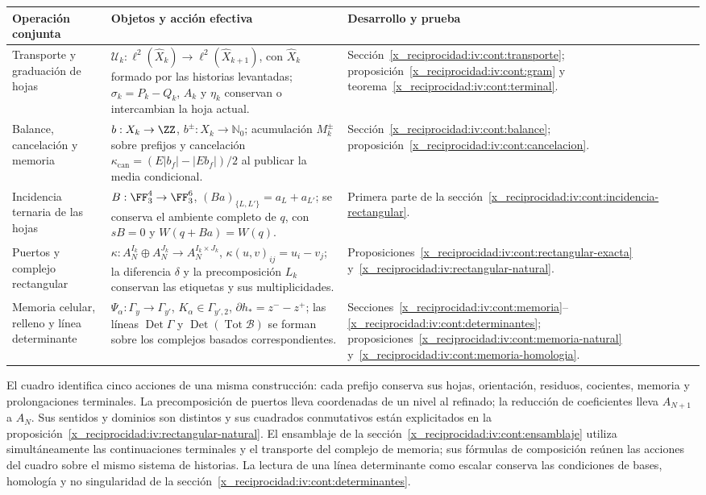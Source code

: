 \begin{center}
\small
\begin{tabular}{@{}p{.21\linewidth}p{.48\linewidth}p{.23\linewidth}@{}}
\toprule
Operación conjunta & Objetos y acción efectiva & Desarrollo y prueba\\
\midrule
Transporte y graduación de hojas
& \(\mathcal U_k:\ell^2(\widehat X_k)\to
\ell^2(\widehat X_{k+1})\), con \(\widehat X_k\) formado por
las historias levantadas; \(\sigma_k=P_k-Q_k\), \(A_k\) y
\(\eta_k\) conservan o intercambian la hoja actual.
& Sección~\ref{x_reciprocidad:iv:cont:transporte}; proposición~\ref{x_reciprocidad:iv:cont:gram}
y teorema~\ref{x_reciprocidad:iv:cont:terminal}.\\[5pt]
Balance, cancelación y memoria
& \(b:X_k\to\ZZ\), \(b^\pm:X_k\to\mathbb N_0\);
acumulación \(M_k^\pm\) sobre prefijos y cancelación
\(\kappa_{\mathrm{can}}=(E|b_f|-|Eb_f|)/2\) al publicar
la media condicional.
& Sección~\ref{x_reciprocidad:iv:cont:balance};
proposición~\ref{x_reciprocidad:iv:cont:cancelacion}.\\[5pt]
Incidencia ternaria de las hojas
& \(B:\FF_3^4\to\FF_3^6\),
\((Ba)_{\{L,L'\}}=a_L+a_{L'}\); se conserva el ambiente
completo de \(q\), con \(sB=0\) y \(W(q+Ba)=W(q)\).
& Primera parte de la
sección~\ref{x_reciprocidad:iv:cont:incidencia-rectangular}.\\[5pt]
Puertos y complejo rectangular
& \(\kappa:A_N^{I_k}\oplus A_N^{J_k}\to
A_N^{I_k\times J_k}\), \(\kappa(u,v)_{ij}=u_i-v_j\);
la diferencia \(\delta\) y la precomposición \(L_k\)
conservan las etiquetas y sus multiplicidades.
& Proposiciones~\ref{x_reciprocidad:iv:cont:rectangular-exacta}
y~\ref{x_reciprocidad:iv:rectangular-natural}.\\[5pt]
Memoria celular, relleno y línea determinante
& \(\Psi_\alpha:\Gamma_y\to\Gamma_{y'}\),
\(K_\alpha\in\Gamma_{y',2}\),
\(\partial h_*=z^--z^+\); las líneas
\(\operatorname{Det}\Gamma\) y
\(\operatorname{Det}(\operatorname{Tot}\mathcal B)\)
se forman sobre los complejos basados correspondientes.
& Secciones~\ref{x_reciprocidad:iv:cont:memoria}--\ref{x_reciprocidad:iv:cont:determinantes};
proposiciones~\ref{x_reciprocidad:iv:cont:memoria-natural}
y~\ref{x_reciprocidad:iv:cont:memoria-homologia}.\\
\bottomrule
\end{tabular}
\end{center}

El cuadro identifica cinco acciones de una misma construcción: cada
prefijo conserva sus hojas, orientación, residuos, cocientes, memoria
y prolongaciones terminales. La precomposición de puertos lleva
coordenadas de un nivel al refinado; la reducción de coeficientes
lleva \(A_{N+1}\) a \(A_N\). Sus sentidos y dominios son
distintos y sus cuadrados conmutativos están explicitados en la
proposición~\ref{x_reciprocidad:iv:rectangular-natural}. El ensamblaje de la
sección~\ref{x_reciprocidad:iv:cont:ensamblaje} utiliza simultáneamente las
continuaciones terminales y el transporte del complejo de memoria;
sus fórmulas de composición reúnen las acciones del cuadro sobre el
mismo sistema de historias. La lectura de una línea determinante
como escalar conserva las condiciones de bases, homología y
no singularidad de la sección~\ref{x_reciprocidad:iv:cont:determinantes}.

